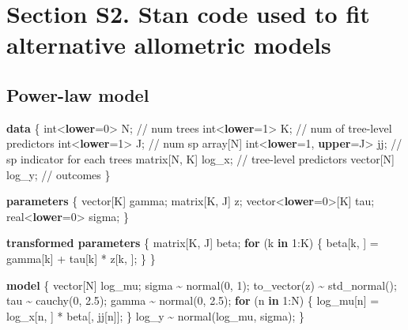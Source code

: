 \documentclass[
  12pt,
  letterpaper,
  DIV=11,
  numbers=noendperiod]{scrartcl}
\newenvironment{Shaded}{\begin{snugshade}}{\end{snugshade}}
\newcommand{\CommentTok}[1]{\textcolor[rgb]{0.37,0.37,0.37}{#1}}
\newcommand{\ControlFlowTok}[1]{\textcolor[rgb]{0.00,0.23,0.31}{\textbf{#1}}}
\newcommand{\DataTypeTok}[1]{\textcolor[rgb]{0.68,0.00,0.00}{#1}}
\newcommand{\DecValTok}[1]{\textcolor[rgb]{0.68,0.00,0.00}{#1}}
\newcommand{\FloatTok}[1]{\textcolor[rgb]{0.68,0.00,0.00}{#1}}
\newcommand{\KeywordTok}[1]{\textcolor[rgb]{0.00,0.23,0.31}{\textbf{#1}}}
\newcommand{\NormalTok}[1]{\textcolor[rgb]{0.00,0.23,0.31}{#1}}
\begin{document}
\newpage

\section{Section S2. Stan code used to fit alternative allometric
models}\label{section-s2.-stan-code-used-to-fit-alternative-allometric-models-1}

\subsection{Power-law model}\label{power-law-model}

\begin{Shaded}
\begin{Highlighting}[]
\KeywordTok{data}\NormalTok{ \{}
  \DataTypeTok{int}\NormalTok{\textless{}}\KeywordTok{lower}\NormalTok{=}\DecValTok{0}\NormalTok{\textgreater{} N;                    }\CommentTok{// num trees}
  \DataTypeTok{int}\NormalTok{\textless{}}\KeywordTok{lower}\NormalTok{=}\DecValTok{1}\NormalTok{\textgreater{} K;                    }\CommentTok{// num of tree{-}level predictors}
  \DataTypeTok{int}\NormalTok{\textless{}}\KeywordTok{lower}\NormalTok{=}\DecValTok{1}\NormalTok{\textgreater{} J;                    }\CommentTok{// num sp}
  \DataTypeTok{array}\NormalTok{[N] }\DataTypeTok{int}\NormalTok{\textless{}}\KeywordTok{lower}\NormalTok{=}\DecValTok{1}\NormalTok{, }\KeywordTok{upper}\NormalTok{=J\textgreater{} jj; }\CommentTok{// sp indicator for each trees}
  \DataTypeTok{matrix}\NormalTok{[N, K] log\_x;                }\CommentTok{// tree{-}level predictors}
  \DataTypeTok{vector}\NormalTok{[N] log\_y;                   }\CommentTok{// outcomes}
\NormalTok{\}}

\KeywordTok{parameters}\NormalTok{ \{}
  \DataTypeTok{vector}\NormalTok{[K] gamma;}
  \DataTypeTok{matrix}\NormalTok{[K, J] z;}
  \DataTypeTok{vector}\NormalTok{\textless{}}\KeywordTok{lower}\NormalTok{=}\DecValTok{0}\NormalTok{\textgreater{}[K] tau;}
  \DataTypeTok{real}\NormalTok{\textless{}}\KeywordTok{lower}\NormalTok{=}\DecValTok{0}\NormalTok{\textgreater{} sigma;}
\NormalTok{\}}

\KeywordTok{transformed parameters}\NormalTok{ \{}
  \DataTypeTok{matrix}\NormalTok{[K, J] beta;}
  \ControlFlowTok{for}\NormalTok{ (k }\ControlFlowTok{in} \DecValTok{1}\NormalTok{:K) \{}
\NormalTok{    beta[k, ] = gamma[k] + tau[k] * z[k, ];}
\NormalTok{  \}}
\NormalTok{\}}

\KeywordTok{model}\NormalTok{ \{}
  \DataTypeTok{vector}\NormalTok{[N] log\_mu;}
\NormalTok{  sigma \textasciitilde{} normal(}\DecValTok{0}\NormalTok{, }\DecValTok{1}\NormalTok{);}
\NormalTok{  to\_vector(z) \textasciitilde{} std\_normal();}
\NormalTok{  tau \textasciitilde{} cauchy(}\DecValTok{0}\NormalTok{, }\FloatTok{2.5}\NormalTok{);}
\NormalTok{  gamma \textasciitilde{} normal(}\DecValTok{0}\NormalTok{, }\FloatTok{2.5}\NormalTok{);}
  \ControlFlowTok{for}\NormalTok{ (n }\ControlFlowTok{in} \DecValTok{1}\NormalTok{:N) \{}
\NormalTok{    log\_mu[n] = log\_x[n, ] * beta[, jj[n]];}
\NormalTok{  \}}
\NormalTok{  log\_y \textasciitilde{} normal(log\_mu, sigma);}
\NormalTok{\}}


\end{Highlighting}
\end{Shaded}
\end{document}
